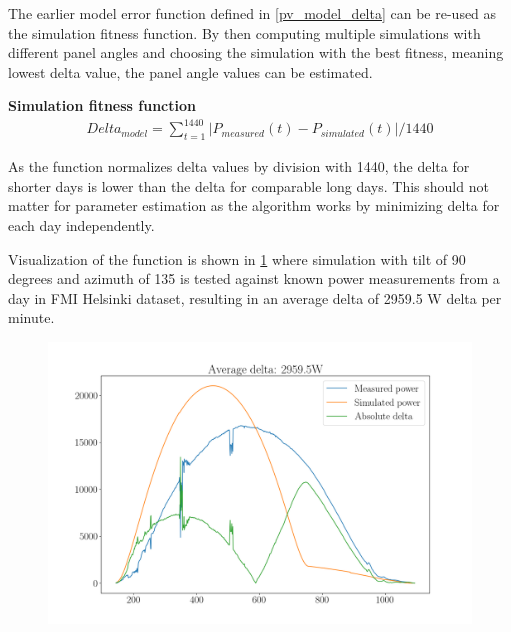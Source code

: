 The earlier model error function defined in \ref{pv_model_delta} can be re-used as the simulation fitness function. By then computing multiple simulations with different panel angles and choosing the simulation with the best fitness, meaning lowest delta value, the panel angle values can be estimated.

\vspace{6mm}
\noindent\textbf{Simulation fitness function}
\begin{equation}
\begin{split}
\label{pv_model_delta}
Delta_{model} = \sum_{t=1}^{1440} |P_{measured}(t) - P_{simulated}(t)| /1440
\end{split}
\end{equation}

\noindent As the function normalizes delta values by division with 1440, the delta for shorter days is lower than the delta for comparable long days. This should not matter for parameter estimation as the algorithm works by minimizing delta for each day independently. 

Visualization of the function is shown in \ref{fig_simulation_fitness} where simulation with tilt of 90 degrees and azimuth of 135 is tested against known power measurements from a day in FMI Helsinki dataset, resulting in an average delta of 2959.5 W delta per minute.



\begin{figure}[h]
\centering
\includegraphics[width=0.8\linewidth]{pics/measured_vs_simulated}
\label{fig_simulation_fitness}
\end{figure}






